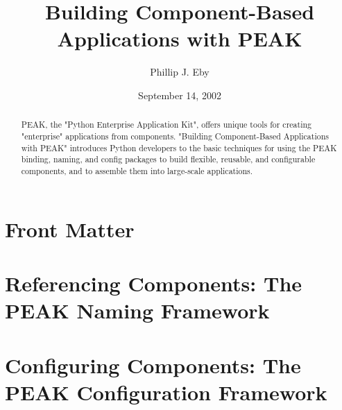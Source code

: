 \documentclass{manual}
\title{Building Component-Based Applications with PEAK}
\author{Phillip J. Eby}
\date{September 14, 2002}       %
\begin{document}
\maketitle

\ifhtml
\chapter*{Front Matter\label{front}}
\fi

%

\begin{abstract}

\noindent

PEAK, the "Python Enterprise Application Kit", offers unique tools for
creating "enterprise" applications from components.  "Building
Component-Based Applications with PEAK" introduces Python developers to
the basic techniques for using the PEAK binding, naming, and config
packages to build flexible, reusable, and configurable components, and
to assemble them into large-scale applications.

\end{abstract}

\tableofcontents





%
\chapter{Referencing Components: The PEAK Naming Framework}

%
\chapter{Configuring Components: The PEAK Configuration Framework}






%
%
%
\renewcommand{\indexname}{Module Index}

\renewcommand{\indexname}{Index}
\end{document}
